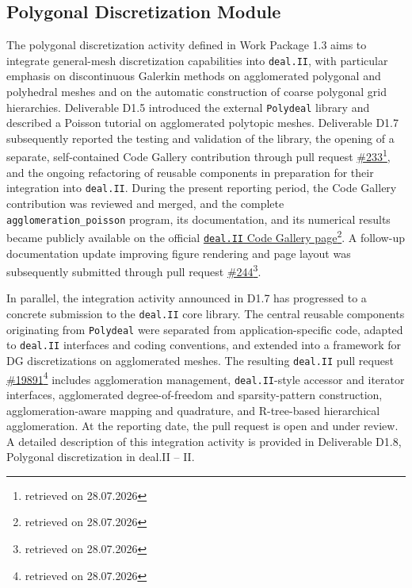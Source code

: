 \documentclass[a4paper,12pt]{article}
\begin{document}
\subsection{Polygonal Discretization Module}
The polygonal discretization activity defined in Work Package 1.3 aims to integrate general-mesh discretization capabilities into \texttt{deal.II}, with particular emphasis on discontinuous Galerkin methods on agglomerated polygonal and polyhedral meshes and on the automatic construction of coarse polygonal grid hierarchies. Deliverable D1.5 introduced the external \texttt{Polydeal} library and described a Poisson tutorial on agglomerated polytopic meshes. Deliverable D1.7 subsequently reported the testing and validation of the library, the opening of a separate, self-contained Code Gallery contribution through pull request \href{https://github.com/dealii/code-gallery/pull/233}{\#233}\footnote{retrieved on 28.07.2026}, and the ongoing refactoring of reusable components in preparation for their integration into \texttt{deal.II}. During the present reporting period, the Code Gallery contribution was reviewed and merged, and the complete \texttt{agglomeration\_poisson} program, its documentation, and its numerical results became publicly available on the official \href{https://dealii.org/developer/doxygen/deal.II/code_gallery_agglomeration_poisson.html}{\texttt{deal.II} Code Gallery page}\footnote{retrieved on 28.07.2026}. A follow-up documentation update improving figure rendering and page layout was subsequently submitted through pull request \href{https://github.com/dealii/code-gallery/pull/244}{\#244}\footnote{retrieved on 28.07.2026}.

In parallel, the integration activity announced in D1.7 has progressed to a concrete submission to the \texttt{deal.II} core library. The central reusable components originating from \texttt{Polydeal} were separated from application-specific code, adapted to \texttt{deal.II} interfaces and coding conventions, and extended into a framework for DG discretizations on agglomerated meshes. The resulting \texttt{deal.II} pull request \href{https://github.com/dealii/dealii/pull/19891}{\#19891}\footnote{retrieved on 28.07.2026} includes agglomeration management, \texttt{deal.II}-style accessor and iterator interfaces, agglomerated degree-of-freedom and sparsity-pattern construction, agglomeration-aware mapping and quadrature, and R-tree-based hierarchical agglomeration. At the reporting date, the pull request is open and under review. A detailed description of this integration activity is provided in Deliverable D1.8, Polygonal discretization in deal.II – II.
\end{document}
